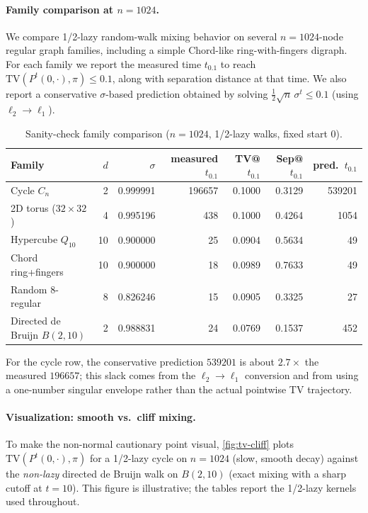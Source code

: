 \documentclass[11pt]{article}
\newcommand{\TV}{\mathrm{TV}}
\begin{document}
\paragraph{Family comparison at $n=1024$.}
We compare 1/2-lazy random-walk mixing behavior on several $n=1024$-node regular
graph families, including a simple Chord-like ring-with-fingers digraph.
For each family we report the measured time $t_{0.1}$ to reach
$\TV(P^t(0,\cdot),\pi)\le 0.1$, along with separation distance at that time.
We also report a conservative $\sigma$-based prediction obtained by solving
$\tfrac12\sqrt{n}\,\sigma^t\le 0.1$ (using $\ell_2\!\to\!\ell_1$).

\begin{table}[h]
\centering
\small
\setlength{\tabcolsep}{4pt}
\begin{tabular}{lrrrrrr}
\toprule
Family & $d$ & $\sigma$ & measured $t_{0.1}$ & TV@ $t_{0.1}$ & Sep@ $t_{0.1}$ & pred.\ $t_{0.1}$ \\
\midrule
Cycle $C_n$ & 2 & 0.999991 & 196657 & 0.1000 & 0.3129 & 539201 \\
2D torus ($32\times 32$) & 4 & 0.995196 & 438 & 0.1000 & 0.4264 & 1054 \\
Hypercube $Q_{10}$ & 10 & 0.900000 & 25 & 0.0904 & 0.5634 & 49 \\
Chord ring+fingers & 10 & 0.900000 & 18 & 0.0989 & 0.7633 & 49 \\
Random 8-regular & 8 & 0.826246 & 15 & 0.0905 & 0.3325 & 27 \\
Directed de Bruijn $B(2,10)$ & 2 & 0.988831 & 24 & 0.0769 & 0.1537 & 452 \\
\bottomrule
\end{tabular}
\caption{Sanity-check family comparison ($n=1024$, 1/2-lazy walks, fixed start $0$).}
\label{tab:families}
\end{table}

For the cycle row, the conservative prediction $539201$ is about $2.7\times$ the
measured $196657$; this slack comes from the $\ell_2\to\ell_1$ conversion and
from using a one-number singular envelope rather than the actual pointwise TV
trajectory.

\paragraph{Visualization: smooth vs.\ cliff mixing.}
To make the non-normal cautionary point visual, \cref{fig:tv-cliff} plots
$\TV(P^t(0,\cdot),\pi)$ for a 1/2-lazy cycle on $n=1024$ (slow, smooth decay)
against the \emph{non-lazy} directed de Bruijn walk on $B(2,10)$ (exact mixing
with a sharp cutoff at $t=10$). This figure is illustrative; the tables report
the 1/2-lazy kernels used throughout.
\end{document}
